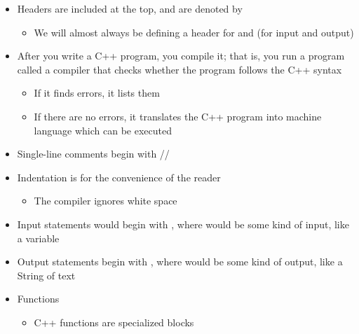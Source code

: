 \begin{itemize}

  \item Headers are included at the top, and are denoted by 

    \begin{itemize}

      \item We will almost always be defining a header for  and  (for input and output)

    \end{itemize}

  \item After you write a C++ program, you compile it; that is, you run a program called a compiler that checks whether the program follows the C++ syntax

    \begin{itemize}

      \item If it finds errors, it lists them

      \item If there are no errors, it translates the C++ program into machine language which can be executed

    \end{itemize}

  \item Single-line comments begin with //

  \item Indentation is for the convenience of the reader

    \begin{itemize}

      \item The compiler ignores white space

    \end{itemize}

  \item Input statements would begin with , where  would be some kind of input, like a variable

  \item Output statements begin with , where  would be some kind of output, like a String of text

  \item Functions

    \begin{itemize}

      \item C++ functions are specialized blocks


\end{itemize}
\end{itemize}
